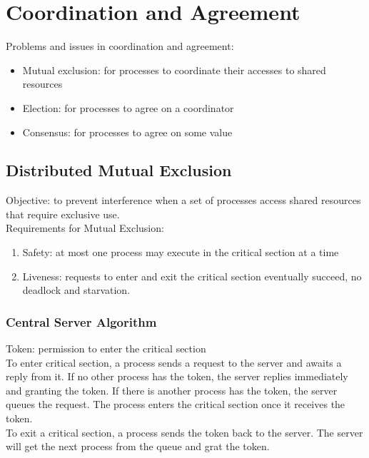\chapter{Coordination and Agreement}
\begin{multicols*}{2}

\noindent Problems and issues in coordination and agreement:
\begin{itemize}
  \item Mutual exclusion: for processes to coordinate their accesses to shared resources
  \item Election: for processes to agree on a coordinator
  \item Consensus: for processes to agree on some value
\end{itemize}

\section{Distributed Mutual Exclusion}

\noindent Objective: to prevent interference when a set of processes access shared resources that require exclusive use.\\

\noindent Requirements for Mutual Exclusion:
\begin{enumerate}
  \item Safety: at most one process may execute in the critical section at a time
  \item Liveness: requests to enter and exit the critical section eventually succeed, no deadlock and starvation. 
\end{enumerate}

\subsection{Central Server Algorithm}

\noindent Token: permission to enter the critical section\\

\noindent To enter critical section, a process sends a request to the server and awaits a reply from it. If no other process has the token, the server replies immediately and granting the token. If there is another process has the token, the server queues the request. The process enters the critical section once it receives the token.\\

\noindent To exit a critical section, a process sends the token back to the server. The server will get the next process from the queue and grat the token.\\


\end{multicols*}
